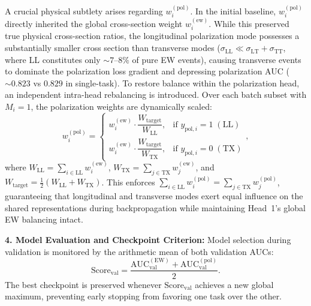 \documentclass[12pt]{article}
\begin{document}
			A crucial physical subtlety arises regarding $w_i^{(\mathrm{pol})}$. In the initial baseline, $w_i^{(\mathrm{pol})}$ directly inherited the global cross-section weight $w_i^{(\mathrm{ew})}$. While this preserved true physical cross-section ratios, the longitudinal polarization mode possesses a substantially smaller cross section than transverse modes ($\sigma_{\mathrm{LL}} \ll \sigma_{\mathrm{LT}} + \sigma_{\mathrm{TT}}$, where LL constitutes only $\sim 7\text{--}8\%$ of pure EW events), causing transverse events to dominate the polarization loss gradient and depressing polarization AUC ($\sim 0.823$ vs $0.829$ in single-task).
			To restore balance within the polarization head, an independent intra-head rebalancing is introduced. Over each batch subset with $M_i = 1$, the polarization weights are dynamically scaled:
			\begin{equation*}
				w_i^{(\mathrm{pol})} = \begin{cases}
					w_i^{(\mathrm{ew})} \cdot \dfrac{W_{\mathrm{target}}}{W_{\mathrm{LL}}}, & \text{if } y_{\mathrm{pol}, i} = 1 \; (\mathrm{LL}) \\[8pt]
					w_i^{(\mathrm{ew})} \cdot \dfrac{W_{\mathrm{target}}}{W_{\mathrm{TX}}}, & \text{if } y_{\mathrm{pol}, i} = 0 \; (\mathrm{TX})
				\end{cases},
			\end{equation*}
			where $W_{\mathrm{LL}} = \sum_{i \in \mathrm{LL}} w_i^{(\mathrm{ew})}$, $W_{\mathrm{TX}} = \sum_{j \in \mathrm{TX}} w_j^{(\mathrm{ew})}$, and $W_{\mathrm{target}} = \frac{1}{2}(W_{\mathrm{LL}} + W_{\mathrm{TX}})$. This enforces $\sum_{i \in \mathrm{LL}} w_i^{(\mathrm{pol})} = \sum_{j \in \mathrm{TX}} w_j^{(\mathrm{pol})}$, guaranteeing that longitudinal and transverse modes exert equal influence on the shared representations during backpropagation while maintaining Head~1's global EW balancing intact.

			\noindent\textbf{4. Model Evaluation and Checkpoint Criterion:} Model selection during validation is monitored by the arithmetic mean of both validation AUCs:
			\begin{equation*}
				\mathrm{Score}_{\mathrm{val}} = \frac{\mathrm{AUC}_{\mathrm{val}}^{(\mathrm{EW})} + \mathrm{AUC}_{\mathrm{val}}^{(\mathrm{pol})}}{2}.
			\end{equation*}
			The best checkpoint is preserved whenever $\mathrm{Score}_{\mathrm{val}}$ achieves a new global maximum, preventing early stopping from favoring one task over the other.

\end{document}
